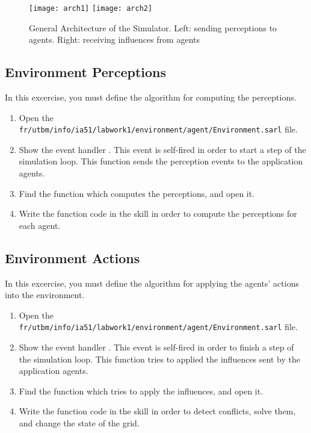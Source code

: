 \documentclass[article,english,nodocumentinfo]{utbmciadreport}
\begin{document}
\begin{figure}
	\texttt{[image: arch1]}
	\hspace{1cm}
	\texttt{[image: arch2]}
	\caption{General Architecture of the Simulator. Left: sending perceptions to agents. Right: receiving influences from agents}
	\label{fig:simulator:arch}
\end{figure}

\subsection{Environment Perceptions}

In this excercise, you must define the algorithm for computing the perceptions.
\begin{enumerate}
\item Open the \texttt{fr/utbm/info/ia51/labwork1/environment/agent/Environment.sarl} file.
\item Show the event handler . This event is self-fired in order to start a step of the simulation loop. This function sends the perception events to the application agents.
\item Find the function which computes the perceptions, and open it.
\item Write the function code in the skill in order to compute the perceptions for each agent.
\end{enumerate}

\subsection{Environment Actions}

In this excercise, you must define the algorithm for applying the agents' actions into the environment.
\begin{enumerate}
\item Open the \texttt{fr/utbm/info/ia51/labwork1/environment/agent/Environment.sarl} file.
\item Show the event handler . This event is self-fired in order to finish a step of the simulation loop. This function tries to applied the influences sent by the application agents.
\item Find the function which tries to apply the influences, and open it.
\item Write the function code in the skill in order to detect conflicts, solve them, and change the state of the grid.
\end{enumerate}
\end{document}
